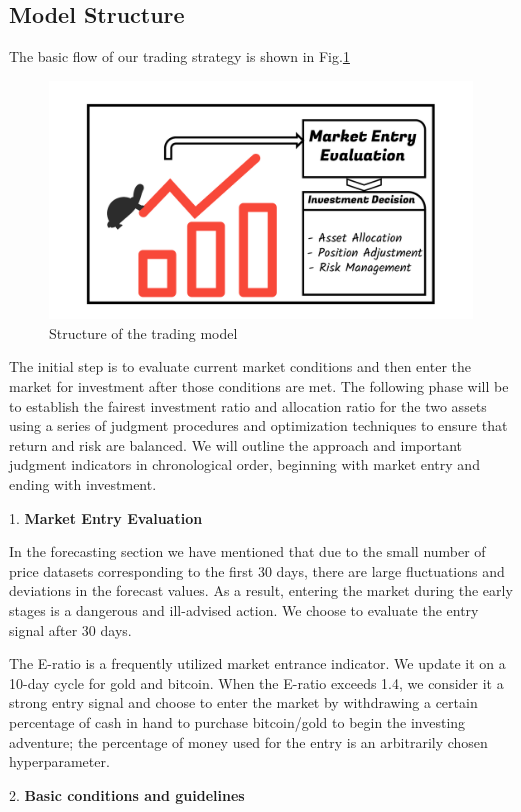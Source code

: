 \documentclass{mcmthesis}
\begin{document}
\subsection{Model Structure}
The basic flow of our trading strategy is shown in Fig.\ref{fig:trade}
\begin{figure}[H]	%
	\centering
	\includegraphics[height=0.4\textwidth]{trade}	%
	\caption{Structure of the trading model} \label{fig:trade}		%
\end{figure}
The initial step is to evaluate current market conditions and then enter the market for investment after those conditions are met. The following phase will be to establish the fairest investment ratio and allocation ratio for the two assets using a series of judgment procedures and optimization techniques to ensure that return and risk are balanced. We will outline the approach and important judgment indicators in chronological order, beginning with market entry and ending with investment.

1. \textbf{Market Entry Evaluation}

In the forecasting section we have mentioned that due to the small number of price datasets corresponding to the first 30 days, there are large fluctuations and deviations in the forecast values. As a result, entering the market during the early stages is a dangerous and ill-advised action. We choose to evaluate the entry signal after 30 days.

The E-ratio is a frequently utilized market entrance indicator. We update it on a 10-day cycle for gold and bitcoin. When the E-ratio exceeds 1.4, we consider it a strong entry signal and choose to enter the market by withdrawing a certain percentage of cash in hand to purchase bitcoin/gold to begin the investing adventure; the percentage of money used for the entry is an arbitrarily chosen hyperparameter.

2. \textbf{Basic conditions and guidelines}
\end{document}
